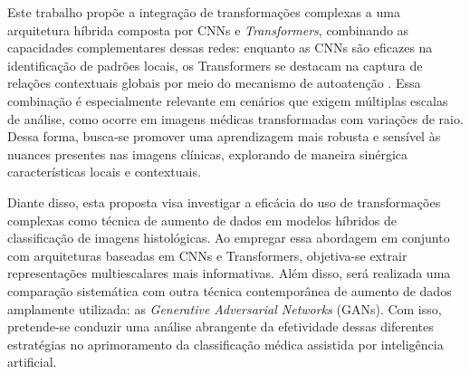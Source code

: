 Este trabalho propõe a integração de transformações complexas a uma arquitetura híbrida composta por CNNs e \textit{Transformers}, combinando as capacidades complementares dessas redes: enquanto as CNNs são eficazes na identificação de padrões locais, os Transformers se destacam na captura de relações contextuais globais por meio do mecanismo de autoatenção \cite{peng2021conformerlocalfeaturescoupling}. Essa combinação é especialmente relevante em cenários que exigem múltiplas escalas de análise, como ocorre em imagens médicas transformadas com variações de raio. Dessa forma, busca-se promover uma aprendizagem mais robusta e sensível às nuances presentes nas imagens clínicas, explorando de maneira sinérgica características locais e contextuais.

Diante disso, esta proposta visa investigar a eficácia do uso de transformações complexas como técnica de aumento de dados em modelos híbridos de classificação de imagens histológicas. Ao empregar essa abordagem em conjunto com arquiteturas baseadas em CNNs e Transformers, objetiva-se extrair representações multiescalares mais informativas. Além disso, será realizada uma comparação sistemática com outra técnica contemporânea de aumento de dados amplamente utilizada: as \textit{Generative Adversarial Networks} (GANs). Com isso, pretende-se conduzir uma análise abrangente da efetividade dessas diferentes estratégias no aprimoramento da classificação médica assistida por inteligência artificial.